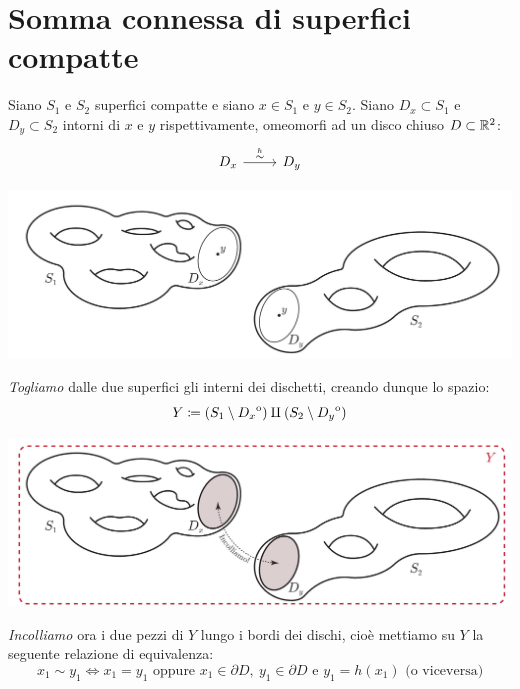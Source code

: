 \section{Somma connessa di superfici compatte}
Siano $S_1$ e $S_2$ superfici compatte e siano $x\in S_1$ e $y\in S_2$. Siano $D_x\subset S_1$ e $D_y\subset S_2$ intorni di $x$ e $y$ rispettivamente, omeomorfi ad un disco chiuso $D\subset\mathbb{R}^2$:
\[\begin{tikzcd}
	{D_x} & {D_y}
	\arrow["{\stackrel{h}{\sim}}", from=1-1, to=1-2]
\end{tikzcd}\]
\begin{center}
	\includegraphics[trim=0cm 0cm 0cm 0cm, clip, scale=0.4]{images/connectedsum1.pdf}
\end{center}
\textit{Togliamo} dalle due superfici gli interni dei dischetti, creando dunque lo spazio:
\begin{equation*}
	Y\coloneqq (S_1\setminus {\kern0ptD_x}^{\mathrm{o}})\amalg (S_2\setminus {\kern0ptD_y}^{\mathrm{o}})
\end{equation*}
\begin{center}
	\includegraphics[trim=0cm 0cm 0cm 0cm, clip, scale=0.4]{images/connectedsum2.pdf}
\end{center}
\textit{Incolliamo} ora i due pezzi di $Y$ lungo i bordi dei dischi, cioè mettiamo su $Y$ la seguente relazione di equivalenza:
\begin{equation*}
	x_1\sim y_1 \iff x_1=y_1\text{ oppure } x_1\in\partial{D},\ y_1\in\partial{D}\text{ e } y_1=h(x_1)\text{ (o viceversa)}
\end{equation*}
